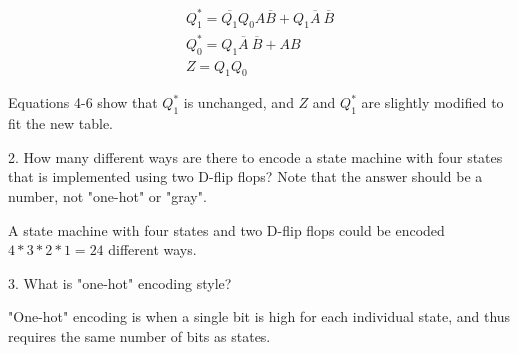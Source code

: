 \documentclass[\FontSize\FontUnit,letterpaper,oneside]{article}
\begin{document}
\begin{align}
  Q_1^* = \overline{Q_1}Q_0A\overline{B} + Q_1\overline{A}\ \overline{B} \\
  Q_0^* = Q_1\overline{A}\ \overline{B} + AB \\
  Z = Q_1Q_0
\end{align}

Equations 4-6 show that $Q_1^*$ is unchanged, and $Z$ and $Q_1^*$ are slightly modified to fit the new table.

\vspace{15pt}

\par 2. How many different ways are there to encode a state machine with four states that is implemented using
two D-flip flops? Note that the answer should be a number, not "one-hot" or "gray".

A state machine with four states and two D-flip flops could be encoded $4 * 3 * 2 * 1 = 24$ different ways.

\vspace{15pt}

\par 3. What is "one-hot" encoding style?

"One-hot" encoding is when a single bit is high for each individual state, and thus requires the same number
of bits as states.

\vspace{15pt}

\label{LastPage}
\end{document}
